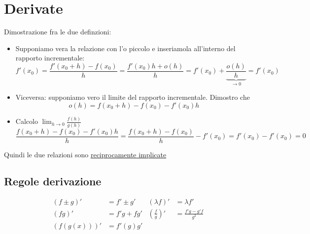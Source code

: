 \section{Derivate}
Dimostrazione fra le due definzioni:
\begin{itemize}
	\item Supponiamo vera la relazione con l'o piccolo e inseriamola all'interno del rapporto incrementale:
		\[
			f'\left( x_0 \right)  = \frac{f'\left( x_0 +h\right) - f\left( x_0 \right) }{h} = \frac{f'\left( x_0 \right) h + o\left( h \right) }{h} = f'\left( x_0 \right) + \underbrace{\frac{o\left( h \right) }{h}}_{ \to 0 } = f'\left( x_0 \right) 
		\]  
	\item Viceversa: supponiamo vero il limite del rapporto incrementale. Dimostro che 
		\[
			o\left( h \right)  = f\left( x_0 + h \right) - f\left( x_0 \right) - f'\left( x_0 \right) h
		\] 
	\item Calcolo $\lim_{h \to 0} \frac{f\left( h \right) }{g\left( h \right) }$
		\[
			\frac{f\left( x_0+h \right) - f\left( x_0 \right) - f'\left( x_0 \right) h}{h} = \frac{f\left( x_0 +h \right) - f\left( x_0 \right)}{h} - f'\left( x_0 \right) = f'\left( x_0 \right) - f' \left( x_0 \right) =0  
		\] 
\end{itemize}
Quindi le due relazioni sono \underline{reciprocamente implicate}
\subsection{Regole derivazione}
\begin{align*}
	\left( f \pm g \right) ' &= f' \pm g' & \left( \lambda f \right) ' &=  \lambda f'\\
	\left( fg \right) '	&=  f'g + fg' & \left( \frac{f}{g} \right) ' &=  \frac{f'g- g'f}{g^2}\\
	\left( f\left( g\left( x \right)   \right)  \right) '  &=  f'\left( g \right) g'
\end{align*}
